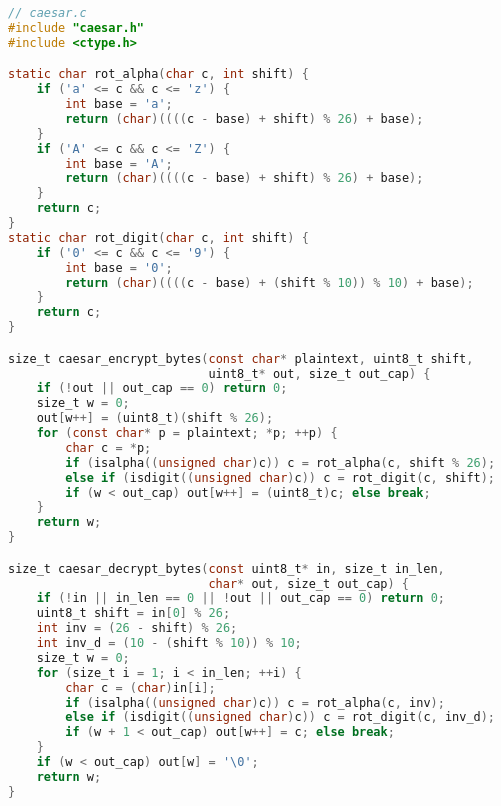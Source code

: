 \documentclass[11pt]{article}
\begin{document}
\begin{lstlisting}[language=C]
// caesar.c
#include "caesar.h"
#include <ctype.h>

static char rot_alpha(char c, int shift) {
    if ('a' <= c && c <= 'z') {
        int base = 'a';
        return (char)((((c - base) + shift) % 26) + base);
    }
    if ('A' <= c && c <= 'Z') {
        int base = 'A';
        return (char)((((c - base) + shift) % 26) + base);
    }
    return c;
}
static char rot_digit(char c, int shift) {
    if ('0' <= c && c <= '9') {
        int base = '0';
        return (char)((((c - base) + (shift % 10)) % 10) + base);
    }
    return c;
}

size_t caesar_encrypt_bytes(const char* plaintext, uint8_t shift,
                            uint8_t* out, size_t out_cap) {
    if (!out || out_cap == 0) return 0;
    size_t w = 0;
    out[w++] = (uint8_t)(shift % 26);
    for (const char* p = plaintext; *p; ++p) {
        char c = *p;
        if (isalpha((unsigned char)c)) c = rot_alpha(c, shift % 26);
        else if (isdigit((unsigned char)c)) c = rot_digit(c, shift);
        if (w < out_cap) out[w++] = (uint8_t)c; else break;
    }
    return w;
}

size_t caesar_decrypt_bytes(const uint8_t* in, size_t in_len,
                            char* out, size_t out_cap) {
    if (!in || in_len == 0 || !out || out_cap == 0) return 0;
    uint8_t shift = in[0] % 26;
    int inv = (26 - shift) % 26;
    int inv_d = (10 - (shift % 10)) % 10;
    size_t w = 0;
    for (size_t i = 1; i < in_len; ++i) {
        char c = (char)in[i];
        if (isalpha((unsigned char)c)) c = rot_alpha(c, inv);
        else if (isdigit((unsigned char)c)) c = rot_digit(c, inv_d);
        if (w + 1 < out_cap) out[w++] = c; else break;
    }
    if (w < out_cap) out[w] = '\0';
    return w;
}
\end{lstlisting}
\end{document}

